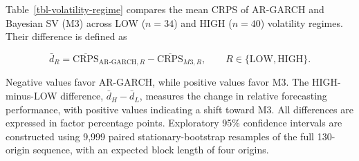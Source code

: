 \documentclass[
  12pt,
  letterpaper,
  DIV=11,
  numbers=noendperiod]{scrreprt}
\begin{document}
Table~\ref{tbl-volatility-regime} compares the mean CRPS of AR-GARCH and
Bayesian SV (M3) across LOW (\(n=34\)) and HIGH (\(n=40\)) volatility
regimes. Their difference is defined as

\[
\bar d_R=\overline{\mathrm{CRPS}}_{\mathrm{AR\text{-}GARCH},R}
-\overline{\mathrm{CRPS}}_{M3,R},
\qquad R\in\{\mathrm{LOW},\mathrm{HIGH}\}.
\]

Negative values favor AR-GARCH, while positive values favor M3. The
HIGH-minus-LOW difference, \(\bar d_H-\bar d_L\), measures the change in
relative forecasting performance, with positive values indicating a
shift toward M3. All differences are expressed in factor percentage
points. Exploratory 95\% confidence intervals are constructed using
9,999 paired stationary-bootstrap resamples of the full 130-origin
sequence, with an expected block length of four origins.
\end{document}
